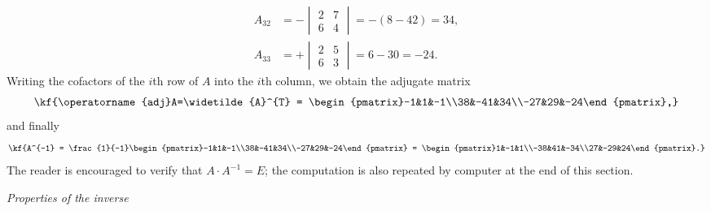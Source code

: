 \begin{misol}
\begin{yechish}
\begin{align*}
A_{32} &= -\begin{vmatrix}2&7\\6&4\end{vmatrix} = -(8-42) = 34, \\
A_{33} &= +\begin{vmatrix}2&5\\6&3\end{vmatrix} = 6-30 = -24.
\end{align*}
Writing the cofactors of the $i$th row of $A$ into the $i$th column, we
obtain the adjugate matrix
\[\kf{\operatorname{adj}A=\widetilde{A}^{T} = \begin{pmatrix}-1&1&-1\\38&-41&34\\-27&29&-24\end{pmatrix},}\]
and finally
\[\kf{A^{-1} = \frac{1}{-1}\begin{pmatrix}-1&1&-1\\38&-41&34\\-27&29&-24\end{pmatrix}
= \begin{pmatrix}1&-1&1\\-38&41&-34\\27&-29&24\end{pmatrix}.}\]
The reader is encouraged to verify that $A\cdot A^{-1}=E$; the computation is
also repeated by computer at the end of this section.
\end{yechish}
\end{misol}
\emph{Properties of the inverse}

